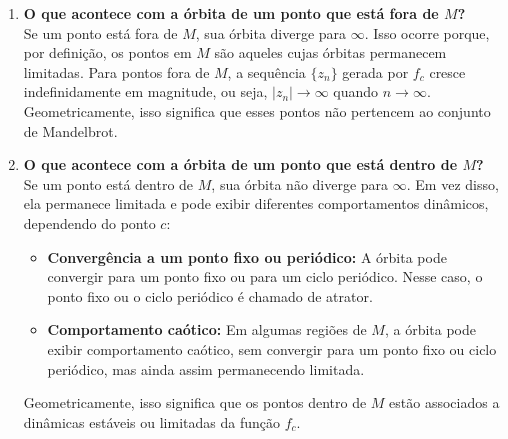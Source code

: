\begin{enumerate}[label=(\alph*)]
    \item \textbf{O que acontece com a órbita de um ponto que está fora de \( M \)?} \\
    
        Se um ponto está fora de \( M \), sua órbita diverge para \( \infty \). Isso ocorre porque, por definição, os pontos em \( M \) são aqueles cujas órbitas permanecem limitadas. Para pontos fora de \( M \), a sequência \( \{z_n\} \) gerada por \( f_c \) cresce indefinidamente em magnitude, ou seja, \( |z_n| \to \infty \) quando \( n \to \infty \). Geometricamente, isso significa que esses pontos não pertencem ao conjunto de Mandelbrot.

    \item \textbf{O que acontece com a órbita de um ponto que está dentro de \( M \)?} \\

        Se um ponto está dentro de \( M \), sua órbita não diverge para \( \infty \). Em vez disso, ela permanece limitada e pode exibir diferentes comportamentos dinâmicos, dependendo do ponto \( c \):

        \begin{itemize}
            \item \textbf{Convergência a um ponto fixo ou periódico:} A órbita pode convergir para um ponto fixo ou para um ciclo periódico. Nesse caso, o ponto fixo ou o ciclo periódico é chamado de atrator.
            \item \textbf{Comportamento caótico:} Em algumas regiões de \( M \), a órbita pode exibir comportamento caótico, sem convergir para um ponto fixo ou ciclo periódico, mas ainda assim permanecendo limitada.
        \end{itemize}

        Geometricamente, isso significa que os pontos dentro de \( M \) estão associados a dinâmicas estáveis ou limitadas da função \( f_c \).

\end{enumerate}